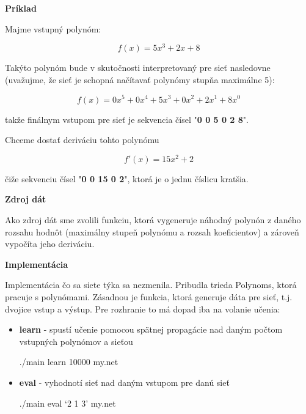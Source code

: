 \documentclass[12pt]{article}
\begin{document}
{\vspace*{0.5cm}\centering\textbf{Príklad}\\}

Majme vstupný polynóm:

\begin{equation}
f(x)=5x^3 + 2x + 8
\end{equation}

Takýto polynóm bude v skutočnosti interpretovaný pre sieť nasledovne (uvažujme, že sieť je schopná načítavať polynómy stupňa maximálne 5):

\begin{equation}
f(x)=0x^5 + 0x^4 + 5x^3 + 0x^2 + 2x^1 + 8x^0
\end{equation}

\noindent takže finálnym vstupom pre sieť je sekvencia čísel "\textbf{0 0 5 0 2 8}".

Chceme dostať deriváciu tohto polynómu

\begin{equation}
f'(x)=15x^2 + 2
\end{equation}

\noindent čiže sekvenciu čísel "\textbf{0 0 15 0 2}", ktorá je o jednu číslicu kratšia.

{\vspace*{0.5cm}\centering\textbf{Zdroj dát}\\}

Ako zdroj dát sme zvolili funkciu, ktorá vygeneruje náhodný polynón z daného rozsahu hodnôt (maximálny stupeň polynómu a rozsah koeficientov) a zároveň vypočíta jeho deriváciu. 

{\vspace*{0.5cm}\centering\textbf{Implementácia}\\}

Implementácia čo sa siete týka sa nezmenila. Pribudla trieda Polynoms, ktorá pracuje s polynómami. Zásadnou je funkcia, ktorá generuje dáta pre sieť, t.j. dvojice vstup a výstup. Pre rozhranie to má dopad iba na volanie učenia:

\begin{itemize}
\item \textbf{learn} - spustí učenie pomocou spätnej propagácie nad daným počtom vstupných polynómov a sieťou

{\centering\small ./main learn 10000 my.net \\}

\item \textbf{eval} - vyhodnotí sieť nad daným vstupom pre danú sieť

{\centering\small ./main eval `2 1 3' my.net \\}

\end{itemize}
\end{document}
